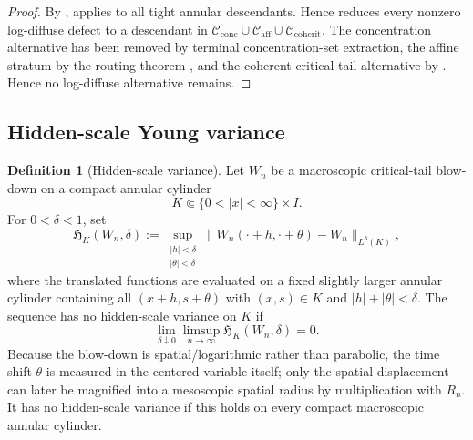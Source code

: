\documentclass[11pt]{amsart}
\numberwithin{equation}{section}
\theoremstyle{plain}
\theoremstyle{definition}
\newtheorem{definition}[definition]{Definition}
\theoremstyle{remark}
\newcommand{\Cactive}{\mathcal C_{\mathrm{conc}}}
\newcommand{\Caff}{\mathcal C_{\mathrm{aff}}}
\newcommand{\Ccohcrit}{\mathcal C_{\mathrm{cohcrit}}}
\begin{document}
\begin{proof}
By ,
 applies to all tight
annular descendants.  Hence  reduces
every nonzero log-diffuse defect to a descendant in
\(\Cactive\cup\Caff\cup\Ccohcrit\).  The concentration alternative has been removed by
terminal concentration-set extraction, the affine stratum by
the routing theorem , and the coherent critical-tail
alternative by .  Hence no
log-diffuse alternative remains.
\end{proof}

\subsection{Hidden-scale Young variance}
\label{subsec:hidden-scale-young-variance}

\begin{definition}[Hidden-scale variance]
\label{def:hidden-scale-variance}
Let \(W_n\) be a macroscopic critical-tail blow-down on a compact annular
cylinder
\[
   K\Subset\{0<|x|<\infty\}\times I .
\]
For \(0<\delta<1\), set
\[
   \mathfrak H_K(W_n,\delta)
   :=
   \sup_{\substack{|h|<\delta\\ |\theta|<\delta}}
   \|W_n(\cdot+h,\cdot+\theta)-W_n\|_{L^3(K)} ,
\]
where the translated functions are evaluated on a fixed slightly larger
annular cylinder containing all \((x+h,s+\theta)\) with
\((x,s)\in K\) and \(|h|+|\theta|<\delta\).  The sequence has no hidden-scale
variance on \(K\) if
\[
   \lim_{\delta\downarrow0}\limsup_{n\to\infty}
   \mathfrak H_K(W_n,\delta)=0 .
\]
Because the blow-down is spatial/logarithmic rather than parabolic, the time
shift \(\theta\) is measured in the centered variable itself; only the spatial
displacement can later be magnified into a mesoscopic spatial radius by
multiplication with \(R_n\).
It has no hidden-scale variance if this holds on every compact macroscopic
annular cylinder.
\end{definition}
\end{document}
